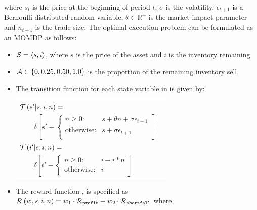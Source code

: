 where {\footnotesize $ s_t $ } is the price at the beginning of period {\footnotesize $ t $}, {\footnotesize $\sigma$} is the volatility, {\footnotesize $\epsilon_{t+1}$} is a Bernoulli distributed random variable, {\footnotesize $\theta \in \mathbb{R}^{+}$ } is the market impact parameter and {\footnotesize $n_{t + 1}$} is the trade size. The optimal execution problem can be formulated as an MOMDP as follows:
\begin{itemize}
    \item {\footnotesize $ \mathcal{S} = \left\langle s, i \right\rangle$}, where $ s $ is the price of the asset and $ i $ is the inventory remaining 
    \item {\footnotesize $ \mathcal{A} \in \left\lbrace 0, 0.25, 0.50, 1.0 \right\rbrace $} is the proportion of the remaining inventory sell
    \item The transition function {\footnotesize \Transition} for each state variable in {\footnotesize \State} is given by:    
    {\footnotesize 
        \abovedisplayskip=5pt
        \belowdisplayskip=0pt
        \renewcommand{\arraystretch}{1.5}
        \begin{tabular}{ll}
            $ \mathcal{T}\left( s' | s, i, n \right) = $ & $ $ \\
            $ \qquad \delta \left[ s' - \begin{cases}
            n \geq 0  : & s + \theta n + \sigma \epsilon_{t+1} \\
            \text{otherwise} : & s + \sigma \epsilon_{t+1} \\
            \end{cases} \right] $ & $ $\\            
            $ \mathcal{T}\left( i' | s, i, n \right) = $ & $ $ \\
            $ \qquad \delta \left[ i' - \begin{cases}
            n \geq 0 : & i - i * n \\
            \text{otherwise} : & i \\
            \end{cases} \right] $ & $ $\\
        \end{tabular}
    }%
    \item The reward function {\footnotesize \Reward}, is specified as {\footnotesize $ \mathcal{R}\left(\vec{w}, s, i, n \right) = w_1 \cdot \mathcal{R}_{\mathtt{profit}} + w_2 \cdot \mathcal{R}_{\mathtt{shortfall}} $} where, \\
    {\footnotesize 
}
\end{itemize}
